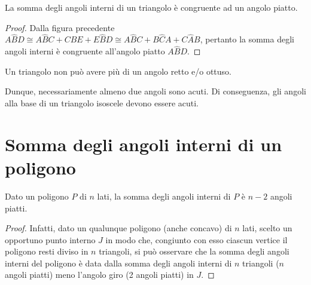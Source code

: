 \begin{corollario}
  La somma degli angoli interni di un triangolo è congruente ad un 
  angolo piatto.
\end{corollario}
\begin{proof}
  Dalla figura precedente \(A\widehat{B}D\cong A\widehat{B}C + 
  C\widehat{B}E + E\widehat{B}D\cong A\widehat{B}C + B\widehat{C}A + 
  C\widehat{A}B\), pertanto la somma degli angoli interni è congruente 
  all'angolo piatto \(A\widehat{B}D\).
\end{proof}
\begin{corollario}
  Un triangolo non può avere più di un angolo retto e/o ottuso.
\end{corollario}
Dunque, necessariamente almeno due angoli sono acuti. Di conseguenza, 
gli angoli alla base di un triangolo isoscele devono essere acuti.

\section{Somma degli angoli interni di un poligono}
  \label{sect:angoli_interni_poligono}

\begin{teorema}
  Dato un poligono \(P\) di \(n\) lati, la somma degli angoli interni di 
  \(P\) è \(n-2\) angoli piatti.
\end{teorema}
\noindent \begin{minipage}{0.5\textwidth}
  \begin{proof}
    Infatti, dato un qualunque poligono (anche concavo) di \(n\) lati, 
    scelto un opportuno punto interno \(J\) in modo che, congiunto con esso 
    ciascun vertice il poligono resti diviso in \(n\) triangoli, si può 
    osservare che la somma degli angoli interni del poligono è data dalla 
    somma degli angoli interni di \(n\) triangoli (\(n\) angoli piatti) meno 
    l'angolo giro (2 angoli piatti) in \(J\).
  \end{proof}
\end{minipage}\hfil
\begin{minipage}{0.5\textwidth}
  \centering
\end{minipage}

